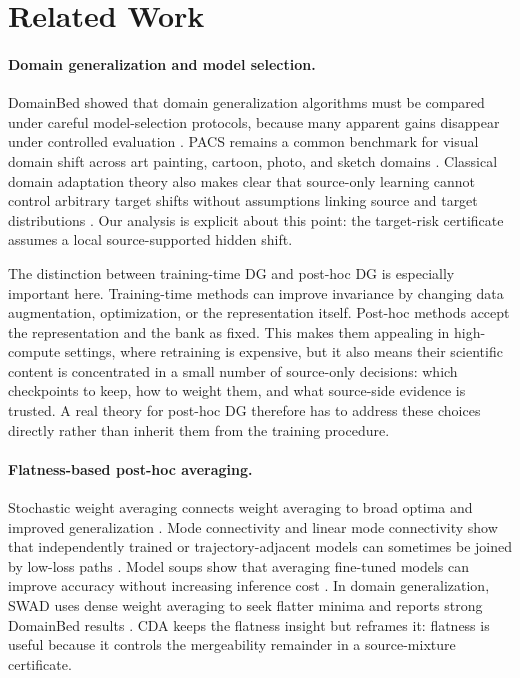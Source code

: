 \documentclass{article}
\theoremstyle{definition}
\newcommand{\swad}{\textup{\textsc{SWAD}}}
\begin{document}
\section{Related Work}

\paragraph{Domain generalization and model selection.}
DomainBed showed that domain generalization algorithms must be compared under careful model-selection protocols, because many apparent gains disappear under controlled evaluation \citep{gulrajani2021domainbed}. PACS remains a common benchmark for visual domain shift across art painting, cartoon, photo, and sketch domains \citep{li2017deeper}. Classical domain adaptation theory also makes clear that source-only learning cannot control arbitrary target shifts without assumptions linking source and target distributions \citep{ben2010theory}. Our analysis is explicit about this point: the target-risk certificate assumes a local source-supported hidden shift.

The distinction between training-time DG and post-hoc DG is especially important here. Training-time methods can improve invariance by changing data augmentation, optimization, or the representation itself. Post-hoc methods accept the representation and the bank as fixed. This makes them appealing in high-compute settings, where retraining is expensive, but it also means their scientific content is concentrated in a small number of source-only decisions: which checkpoints to keep, how to weight them, and what source-side evidence is trusted. A real theory for post-hoc DG therefore has to address these choices directly rather than inherit them from the training procedure.

\paragraph{Flatness-based post-hoc averaging.}
Stochastic weight averaging connects weight averaging to broad optima and improved generalization \citep{izmailov2018swa}. Mode connectivity and linear mode connectivity show that independently trained or trajectory-adjacent models can sometimes be joined by low-loss paths \citep{garipov2018mode,frankle2020linear}. Model soups show that averaging fine-tuned models can improve accuracy without increasing inference cost \citep{wortsman2022soups}. In domain generalization, \swad{} uses dense weight averaging to seek flatter minima and reports strong DomainBed results \citep{cha2021swad}. CDA keeps the flatness insight but reframes it: flatness is useful because it controls the mergeability remainder in a source-mixture certificate.
\end{document}
